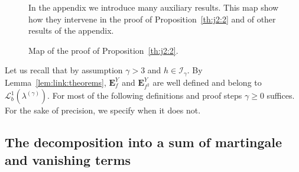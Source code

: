 \documentclass[12pt]{article}
\numberwithin{equation}{section}
\theoremstyle{definition}
\theoremstyle{remark}
\newcommand{\Lgb}[1]{\mathcal{L}^{1}_{b}(\lambda^{(#1)})}
\newcommand{\Lg}[1]{\mathcal{I}_{#1}}
\newcommand{\bfH}[1]{\mathbf{E}^Y_{#1}}
\begin{document}
\begin{figure}[t]
\begin{center}
\end{center}
\captionsetup{singlelinecheck=off}
\caption[Proof Prop map]{Map of the proof of Proposition~\ref{th:j2:2}.}\label{ProofMapProp}
In the appendix we introduce many auxiliary results. This map show how they intervene in the proof of Proposition~\ref{th:j2:2} and of other results of the appendix. %
\end{figure}





Let us recall that by assumption $\gamma >3$ and $h\in \Lg{\gamma}$. 
By Lemma~\ref{lem:link:theorems}, $\bfH{f}$ and $\bfH{f^2}$ are well defined and belong to $\Lgb{\gamma}$.
For most of the following definitions and proof steps $\gamma\geq 0$ suffices. For the sake of precision, we specify when it does not.
%



\subsection{The decomposition into a sum of martingale and vanishing terms} \label{sec:decomposition}
\end{document}
